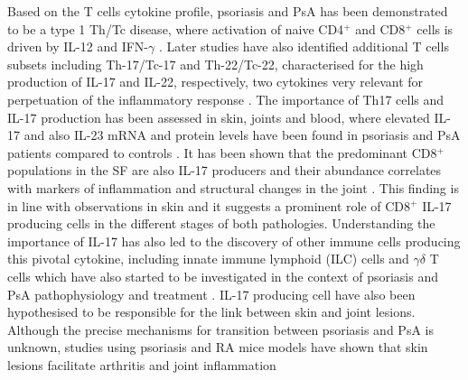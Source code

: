 Based on the T cells cytokine profile, psoriasis and PsA has been demonstrated to be a type 1 Th/Tc disease, where activation of naive CD4$^{+}$ and CD8$^{+}$ cells is driven by IL-12 and IFN-$\gamma$ \parencite{Austin1999,Perera2012}. Later studies have also identified additional T cells subsets including Th-17/Tc-17 and Th-22/Tc-22, characterised for the high production of IL-17 and IL-22, respectively, two cytokines very relevant for perpetuation of the inflammatory response \parencite{Mahil2016}.  The importance of Th17 cells and IL-17 production has been assessed in skin, joints and blood, where elevated IL-17 and also IL-23 mRNA and protein levels have been found in psoriasis and PsA patients compared to controls \parencite{Cai2012, Dolcino2015}. It has been shown that the predominant CD8$^{+}$ populations in the SF are also IL-17 producers and their abundance correlates with markers of inflammation and structural changes in the joint \parencite{Menon2014}. This finding is in line with observations in skin and it suggests a prominent role of CD8$^{+}$ IL-17 producing cells in the different stages of both pathologies. Understanding the importance of IL-17 has also led to the discovery of other immune cells producing this pivotal cytokine, including innate immune lymphoid (ILC) cells and $\gamma$$\delta$ T cells which have also started to be investigated in the context of psoriasis and PsA pathophysiology and treatment \parencite{Meglio2014,Leijten2015}. IL-17 producing cell have also been hypothesised to be responsible for the link between skin and joint lesions. Although the precise mechanisms for transition between psoriasis and PsA is unknown, studies using psoriasis and RA mice models have shown that skin lesions facilitate arthritis and joint inflammation %

